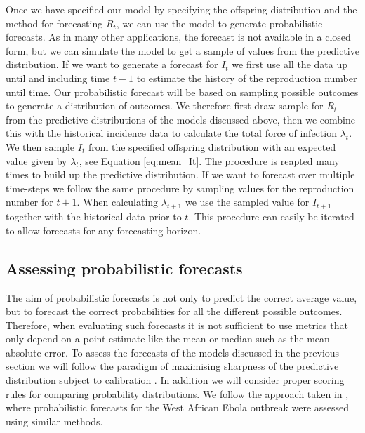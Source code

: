 \documentclass[12pt]{article}
\begin{document}
Once we have specified our model by specifying the offspring distribution and the method for forecasting $R_t$, we can use the model to generate probabilistic forecasts. As in many other applications, the forecast is not available in a closed form, but we can simulate the model to get a sample of values from the predictive distribution. If we want to generate a forecast for $I_{t}$ we first use all the data up until and including time $t-1$ to estimate the history of the reproduction number until time. Our probabilistic forecast will be based on sampling possible outcomes to generate a distribution of outcomes. We therefore first draw sample for $R_{t}$ from the predictive distributions of the models discussed above, then we combine this with the historical incidence data to calculate the total force of infection $\lambda_{t}$. We then sample $I_{t}$ from the specified offspring distribution with an expected value given by $\lambda_{t}$, see Equation \ref{eq:mean_It}. The procedure is reapted many times to build up the predictive distribution. If we want to forecast over multiple time-steps we follow the same procedure by sampling values for the reproduction number for $t+1$. When calculating $\lambda_{t+1}$ we use the sampled value for $I_{t+1}$ together with the historical data prior to $t$. This procedure can easily be iterated to allow forecasts for any forecasting horizon.


\subsection{Assessing probabilistic forecasts}

The aim of probabilistic forecasts is not only to predict the correct average value, but to forecast the correct probabilities for all the different possible outcomes. Therefore, when evaluating such forecasts it is not sufficient to use metrics that only depend on a point estimate like the mean or median such as the mean absolute error. To assess the forecasts of the models discussed in the previous section we will follow the paradigm of maximising sharpness of the predictive distribution subject to calibration \cite{gneitingProbabilisticForecastsCalibration2007}. In addition we will consider proper scoring rules for comparing probability distributions. We follow the approach taken in \cite{funkAssessingPerformanceRealtime2019}, where probabilistic forecasts for the West African Ebola outbreak were assessed using similar methods.
\end{document}

